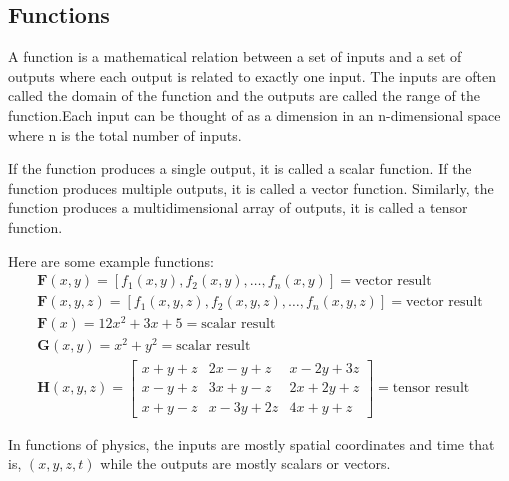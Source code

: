 \subsection{Functions}

A function is a mathematical relation between a set of inputs and a set of outputs
where each output is related to exactly one input. The inputs are often called the
domain of the function and the outputs are called the range of the function.Each
input can be thought of as a dimension in an n-dimensional space where n is the
total number of inputs.

If the function produces a single output, it is called a scalar function.
If the function produces multiple outputs, it is called a vector function.
Similarly, the function produces a multidimensional  array  of outputs,
it is called a tensor function.

Here are some example functions:
\begin{align*}
  \mathbf{F}(x, y) = [f_1(x, y), f_2(x, y), \ldots, f_n(x, y)] = \text{vector result} \\
  \mathbf{F}(x, y, z) = [f_1(x, y, z), f_2(x, y, z), \ldots, f_n(x, y, z)] = \text{vector result} \\
  \mathbf{F}(x) =  12x^2 + 3x + 5 = \text{scalar result} \\
  \mathbf{G}(x, y) = x^2 + y^2 = \text{scalar result} \\
  \mathbf{H}(x, y, z) = \begin{bmatrix}
    x + y + z & 2x - y + z & x - 2y + 3z \\
    x - y + z & 3x + y - z & 2x + 2y + z \\
    x + y - z & x - 3y + 2z & 4x + y + z
  \end{bmatrix} = \text{tensor result}
\end{align*}

In functions of physics, the inputs are mostly spatial coordinates and
time that is, \((x, y, z, t)\) while the outputs are mostly scalars or
vectors.

